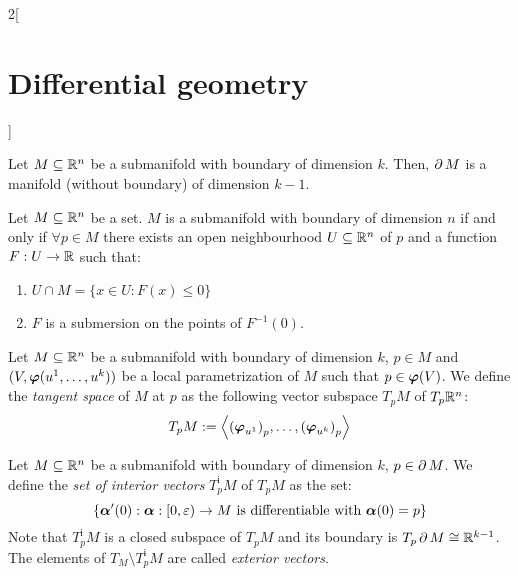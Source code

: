 \documentclass[../../../main.tex]{subfiles}
\begin{document}
\begin{multicols}{2}[\section{Differential geometry}]
\begin{definition}
  \end{definition}
  \begin{proposition}
    Let $M\subseteq\mathbb{R}^n$ be a submanifold with boundary of dimension $k$. Then, $\operatorname{\partial}{M}$ is a manifold (without boundary) of dimension $k-1$.
  \end{proposition}
  \begin{proposition}
    Let $M\subseteq\mathbb{R}^n$ be a set. $M$ is a submanifold with boundary of dimension $n$ if and only if $\forall p\in M$ there exists an open neighbourhood $U\subseteq \mathbb{R}^n$ of $p$ and a function $F:U\rightarrow\mathbb{R}$ such that:
    \begin{enumerate}
      \item $U\cap M=\{x\in U:F(x)\leq 0\}$
      \item $F$ is a submersion on the points of $F^{-1}(0)$.
    \end{enumerate}
  \end{proposition}
  \begin{definition}
    Let $M\subseteq\mathbb{R}^n$ be a submanifold with boundary of dimension $k$, $p\in M$ and $(V,\boldsymbol{\mathrm{\varphi}}(u^1,\ldots,u^k))$ be a local parametrization of $M$ such that $p\in\boldsymbol{\mathrm{\varphi}}(V)$. We define the \emph{tangent space} of $M$ at $p$ as the following vector subspace $T_pM$ of $T_p\mathbb{R}^n$: $$T_pM:=\left\langle{\left(\boldsymbol{\mathrm{\varphi}}_{u^1}\right)}_p,\ldots,{\left(\boldsymbol{\mathrm{\varphi}}_{u^k}\right)}_p\right\rangle$$
  \end{definition}
  \begin{definition}
    Let $M\subseteq\mathbb{R}^n$ be a submanifold with boundary of dimension $k$, $p\in \operatorname{\partial}{M}$. We define the \emph{set of interior vectors} $T_p^\text{i}M$ of $T_pM$ as the set:
    $$\{\boldsymbol{\mathrm{\alpha}}'(0):\boldsymbol{\mathrm{\alpha}}:[0,\varepsilon)\rightarrow M\text{ is differentiable with }\boldsymbol{\mathrm{\alpha}}(0)=p\}$$
    Note that $T_p^\text{i}M$ is a closed subspace of $T_pM$ and its boundary is $T_p\operatorname{\partial}{M}\cong\mathbb{R}^{k-1}$.
    The elements of $T_M\setminus T_p^\text{i}M$ are called \emph{exterior vectors}.
  \end{definition}

\end{multicols}
\end{document}
